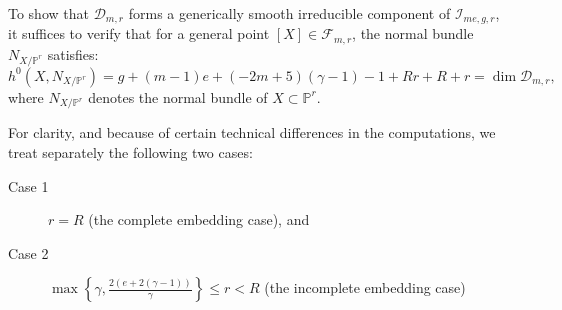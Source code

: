 \documentclass[a4paper,12pt]{amsart}
\def\dim{\operatorname{dim}}
\begin{document}
To show that $\mathcal{D}_{m,r}$ forms a generically smooth irreducible component of $\mathcal{I}_{me, g, r}$, it suffices to verify that for a general point $[X] \in \mathcal{F}_{m,r}$, the normal bundle $N_{X/\mathbb{P}^r}$ satisfies:
\[
 h^0 (X, N_{X/\mathbb{P}^r}) = g + (m - 1)e + (-2m + 5)(\gamma - 1) - 1 + Rr + R + r = \dim \mathcal{D}_{m,r} ,
\]
where $N_{X/\mathbb{P}^r}$ denotes the normal bundle of $X \subset \mathbb{P}^r$.

For clarity, and because of certain technical differences in the computations, we treat separately the following two cases:
\begin{description}
 \item[Case 1] $r = R$ (the complete embedding case), and

 \item[Case 2] $\max \left\lbrace \gamma, \frac{2(e+2(\gamma-1))}{\gamma} \right\rbrace \leq r < R$ (the incomplete embedding case)
\end{description}

\medskip
\end{document}
